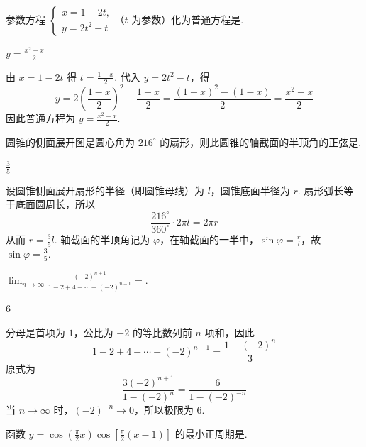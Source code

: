 \documentclass[UTF8,a4paper,oneside,11pt]{ctexbook}
\begin{document}
\begin{problem}
参数方程 \(\begin{cases}
x=1-2t,\\
y=2t^2-t
\end{cases}\)（\(t\) 为参数）化为普通方程是\fillinblank{}.
\end{problem}

\begin{answer}
\(y=\frac{x^2-x}{2}\)
\end{answer}

\begin{solution}
由 \(x=1-2t\) 得 \(t=\frac{1-x}{2}\). 代入 \(y=2t^2-t\)，得
\[
y=2\left(\frac{1-x}{2}\right)^2-\frac{1-x}{2}=\frac{(1-x)^2-(1-x)}2=\frac{x^2-x}{2}
\]
因此普通方程为 \(y=\frac{x^2-x}{2}\).
\end{solution}

\begin{problem}
圆锥的侧面展开图是圆心角为 \(216^\circ\) 的扇形，则此圆锥的轴截面的半顶角的正弦是\fillinblank{}.
\end{problem}

\begin{answer}
\(\frac{3}{5}\)
\end{answer}

\begin{solution}
设圆锥侧面展开扇形的半径（即圆锥母线）为 \(l\)，圆锥底面半径为 \(r\). 扇形弧长等于底面圆周长，所以
\[
\frac{216^\circ}{360^\circ}\cdot2\pi l=2\pi r
\]
从而 \(r=\frac35l\). 轴截面的半顶角记为 \(\varphi\)，在轴截面的一半中，\(\sin\varphi=\frac rl\)，故 \(\sin\varphi=\frac35\).
\end{solution}

\begin{problem}
\(\displaystyle\lim_{n\to\infty}\frac{(-2)^{n+1}}{1-2+4-\cdots+(-2)^{n-1}}=\)\fillinblank{}.
\end{problem}

\begin{answer}
\(6\)
\end{answer}

\begin{solution}
分母是首项为 \(1\)，公比为 \(-2\) 的等比数列前 \(n\) 项和，因此
\[
1-2+4-\cdots+(-2)^{n-1}=\frac{1-(-2)^n}{3}
\]
原式为
\[
\frac{3(-2)^{n+1}}{1-(-2)^n}=\frac{6}{1-(-2)^{-n}}
\]
当 \(n\to\infty\) 时，\((-2)^{-n}\to0\)，所以极限为 \(6\).
\end{solution}

\begin{problem}
函数 \(y=\cos\left( \frac{\pi}{2}x \right)\cos\left[ \frac{\pi}{2}(x-1) \right]\) 的最小正周期是\fillinblank{}.
\end{problem}
\end{document}
